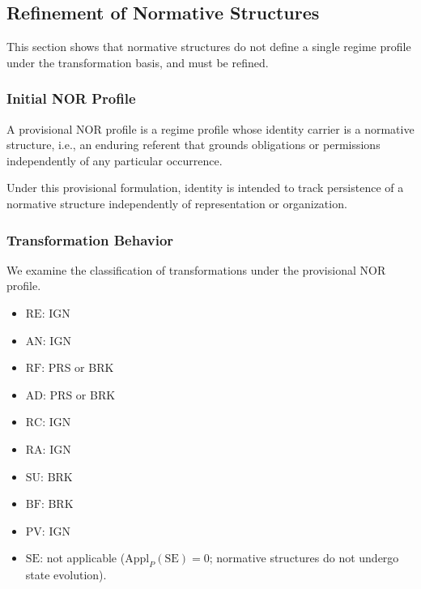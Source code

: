 
\subsection{Refinement of Normative Structures}
\label{subsec:nor_split}

This section shows that normative structures do not define a single
regime profile under the transformation basis, and must be refined.

\subsubsection{Initial NOR Profile}

\begin{definition}
A provisional NOR profile is a regime profile whose identity carrier is
a normative structure, i.e., an enduring referent that grounds obligations
or permissions independently of any particular occurrence.
\end{definition}


Under this provisional formulation, identity is intended to track persistence
of a normative structure independently of representation or organization.


\subsubsection{Transformation Behavior}

We examine the classification of transformations under the provisional NOR profile.

\begin{itemize}
\item $\mathrm{RE}$: IGN
\item $\mathrm{AN}$: IGN
\item $\mathrm{RF}$: PRS or BRK
\item $\mathrm{AD}$: PRS or BRK
\item $\mathrm{RC}$: IGN
\item $\mathrm{RA}$: IGN
\item $\mathrm{SU}$: BRK
\item $\mathrm{BF}$: BRK
\item $\mathrm{PV}$: IGN
\item $\mathrm{SE}$: not applicable
      ($\mathrm{Appl}_P(\mathrm{SE}) = 0$;
      normative structures do not undergo state evolution).
\end{itemize}


